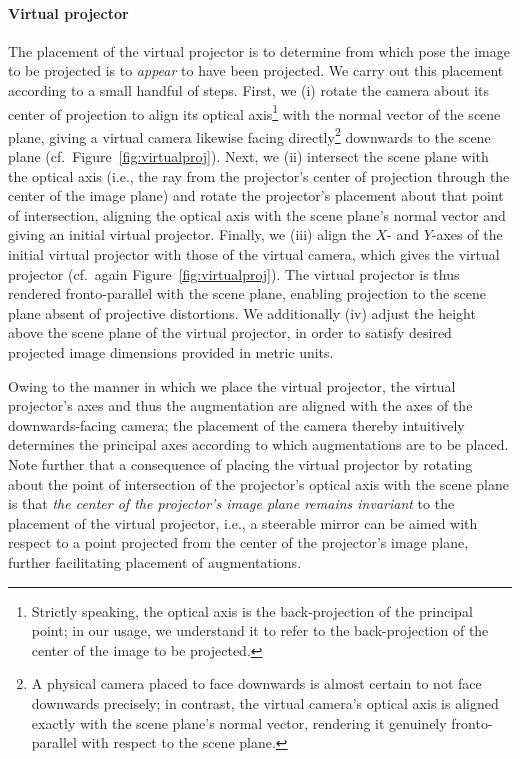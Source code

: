 \documentclass[review]{elsarticle}
\begin{document}
\paragraph{Virtual projector} The placement of the virtual projector is to determine from which pose the image to be projected is to \textit{appear} to have been projected. We carry out this placement according to a small handful of steps. First, we (i) rotate the camera about its center of projection to align its optical axis\footnote{Strictly speaking, the optical axis is the back-projection of the principal point; in our usage, we understand it to refer to the back-projection of the center of the image to be projected.} with the normal vector of the scene plane, giving a virtual camera likewise facing directly\footnote{A physical camera placed to face downwards is almost certain to not face downwards precisely; in contrast, the virtual camera's optical axis is aligned exactly with the scene plane's normal vector, rendering it genuinely fronto-parallel with respect to the scene plane.} downwards to the scene plane (cf.\ Figure~\ref{fig:virtualproj}). Next, we (ii) intersect the scene plane with the optical axis (i.e., the ray from the projector's center of projection through the center of the image plane) and rotate the projector's placement about that point of intersection, aligning the optical axis with the scene plane's normal vector and giving an initial virtual projector. Finally, we (iii) align the $X$- and $Y$-axes of the initial virtual projector with those of the virtual camera, which gives the virtual projector (cf.\ again Figure~\ref{fig:virtualproj}). The virtual projector is thus rendered fronto-parallel with the scene plane, enabling projection to the scene plane absent of projective distortions. We additionally (iv) adjust the height above the scene plane of the virtual projector, in order to satisfy desired projected image dimensions provided in metric units.

Owing to the manner in which we place the virtual projector, the virtual projector's axes and thus the augmentation are aligned with the axes of the downwards-facing camera; the placement of the camera thereby intuitively determines the principal axes according to which augmentations are to be placed. Note further that a consequence of placing the virtual projector by rotating about the point of intersection of the projector's optical axis with the scene plane is that \textit{the center of the projector's image plane remains invariant} to the placement of the virtual projector, i.e., a steerable mirror can be aimed with respect to a point projected from the center of the projector's image plane, further facilitating placement of augmentations.
\end{document}
